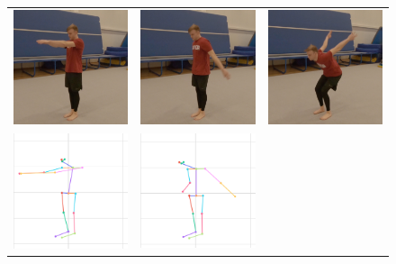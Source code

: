 \begin{figure}
   \centering
\begin{tabular}{ccc}
\includegraphics[width=5cm]{images/data-preprocessing/centered-backflip-orig-part-1}&
\includegraphics[width=5cm]{images/data-preprocessing/centered-backflip-orig-part-2}&
\includegraphics[width=5cm]{images/data-preprocessing/centered-backflip-orig-part-3}\\
\includegraphics[width=5cm]{images/data-preprocessing/centered-backflip-skel-part-1}&
\includegraphics[width=5cm]{images/data-preprocessing/centered-backflip-skel-part-2}&

\end{tabular}
\end{figure}
